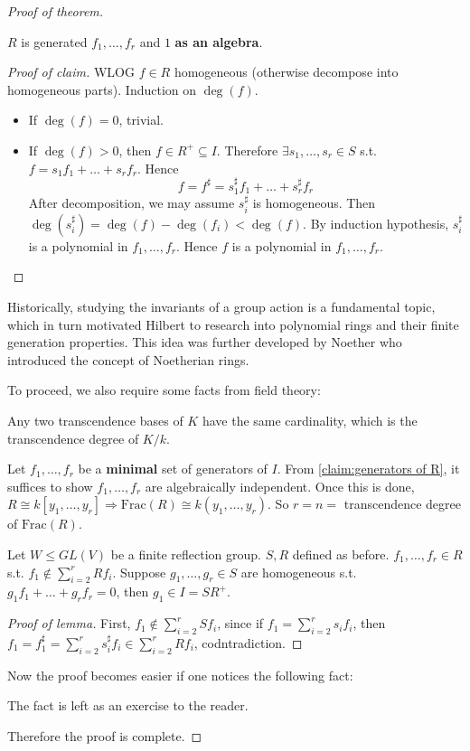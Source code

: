 \documentclass[UTF8, 12pt]{extarticle}
\begin{document}
\begin{proof}[Proof of theorem]
        \begin{claim}\label{claim:generators of R}
                $R$ is generated $f_1, \dots, f_r$ and $1$ \textbf{as an algebra}.
        \end{claim}
        \begin{proof}[Proof of claim]
            WLOG $f\in R$ homogeneous (otherwise decompose into homogeneous parts). Induction on $\deg(f)$.
            \begin{itemize}
                \item If $\deg(f) = 0$, trivial.
                \item If $\deg(f) >0$, then $f\in R^+\subseteq I$. Therefore $\exists s_1, \dots, s_r\in S$ s.t. $f = s_1 f_1 + \dots + s_r f_r$. Hence
                    $$f = f^\sharp = s_1^\sharp f_1 + \dots + s_r^\sharp f_r$$
                    After decomposition, we may assume $s_i^\sharp$ is homogeneous. Then $\deg(s_i^\sharp) = \deg(f) - \deg(f_i) < \deg(f)$. By induction hypothesis, $s_i^\sharp$ is a polynomial in $f_1, \dots, f_r$. Hence $f$ is a polynomial in $f_1, \dots, f_r$.
            \end{itemize}
        \end{proof}
        \begin{hisnote}
            Historically, studying the invariants of a group action is a fundamental topic, which in turn motivated Hilbert to research into polynomial rings and their finite generation properties. This idea was further developed by Noether who introduced the concept of Noetherian rings.
        \end{hisnote}
        To proceed, we also require some facts from field theory:
        \begin{theorem}
            Any two transcendence bases of $K$ have the same cardinality, which is the transcendence degree of $K/k$.
        \end{theorem}
        Let $f_1, \dots, f_r$ be a \textbf{minimal} set of generators of $I$. From \cref{claim:generators of R}, it suffices to show $f_1, \dots, f_r$ are algebraically independent. Once this is done, $R\cong k[y_1, \dots, y_r]\Rightarrow \mathrm{Frac}(R)\cong k(y_1, \dots, y_r)$. So $r = n =$ transcendence degree of $\mathrm{Frac}(R)$.
        \begin{lemma}
            Let $W\le GL(V)$ be a finite reflection group. $S, R$ defined as before. $f_1, \dots, f_r\in R$ s.t. $f_1\notin \sum_{i=2}^{r} Rf_i$. Suppose $g_1, \dots, g_r\in S$ are homogeneous s.t. $g_1 f_1 + \dots + g_r f_r = 0$, then $g_1\in I = SR^+$.
        \end{lemma}
        \begin{proof}[Proof of lemma]
            First, $f_1\notin \sum_{i=2}^{r} Sf_i$, since if $f_1 = \sum_{i=2}^{r} s_i f_i$, then $f_1 = f_1^\sharp = \sum_{i=2}^{r} s_i^\sharp f_i\in \sum_{i=2}^{r} Rf_i$, codntradiction.
        \end{proof}
        Now the proof becomes easier if one notices the following fact:
        \begin{fact}
            The fact is left as an exercise to the reader.
        \end{fact}
        \noindent Therefore the proof is complete.


\end{proof}
\end{document}

